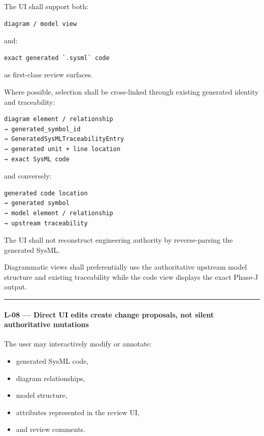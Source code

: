 The UI shall support both:

\begin{verbatim}
diagram / model view
\end{verbatim}

and:

\begin{verbatim}
exact generated `.sysml` code
\end{verbatim}

as first-class review surfaces.

Where possible, selection shall be cross-linked through existing generated identity and traceability:

\begin{verbatim}
diagram element / relationship
→ generated_symbol_id
→ GeneratedSysMLTraceabilityEntry
→ generated unit + line location
→ exact SysML code
\end{verbatim}

and conversely:

\begin{verbatim}
generated code location
→ generated symbol
→ model element / relationship
→ upstream traceability
\end{verbatim}

The UI shall not reconstruct engineering authority by reverse-parsing the generated SysML.

Diagrammatic views shall preferentially use the authoritative upstream model structure and existing traceability while the code view displays the exact Phase-J output.

\begin{center}\rule{0.5\linewidth}{0.5pt}\end{center}

\hypertarget{l-08--direct-ui-edits-create-change-proposals-not-silent-authoritative-mutations}{%
\paragraph{L-08 --- Direct UI edits create change proposals, not silent authoritative mutations}\label{l-08--direct-ui-edits-create-change-proposals-not-silent-authoritative-mutations}}

The user may interactively modify or annotate:

\begin{itemize}
\tightlist
\item
  generated SysML code,
\item
  diagram relationships,
\item
  model structure,
\item
  attributes represented in the review UI,
\item
  and review comments.
\end{itemize}

